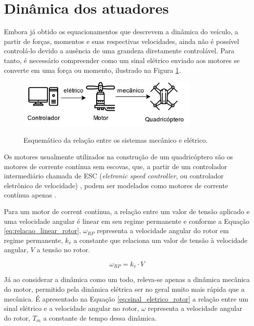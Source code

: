\documentclass[main.tex]{subfiles}
\begin{document}
\section{Dinâmica dos atuadores}

Embora já obtido os equacionamentos que descrevem a dinâmica do veículo, a partir de forças, momentos e suas respectivas velocidades, ainda não é possível controlá-lo devido a ausência de uma grandeza diretamente controlável. Para tanto, é necessário compreender como um sinal elétrico enviado aos motores se converte em uma força ou momento, ilustrado na Figura \ref{fig:sistemas_mecanico_eletrico}. 

\begin{figure}[!h]
	\centering
	\caption{Esquemático da relação entre os sistemas mecânico e elétrico.}
	\includegraphics[width=0.8\textwidth]{capitulos/modelagem/imgs/sistema.png}
	\label{fig:sistemas_mecanico_eletrico}
\end{figure}

Os motores usualmente utilizados na construção de um quadricóptero são os motores de corrente contínua sem escovas, que, a partir de um controlador intermediário chamada de ESC (\textit{eletronic speed controller}, ou controlador eletrônico de velocidade) \cite{esc_ref}, podem ser modelados como motores de corrente contínua apenas \cite{popoola2015modelling}. 

Para um motor de corrent contínua, a relação entre um valor de tensão aplicado e uma velocidade angular é linear em seu regime permanente e conforme a Equação \ref{eq:relacao_linear_rotor}, $\omega_{RP}$ representa a velocidade angular do rotor em regime permanente, $k_v$ a constante que relaciona um valor de tensão à velocidade angular, $V$ a tensão no rotor.

\begin{equation}\label{eq:relacao_linear_rotor}
	\omega_{RP} = k_v \cdot V
\end{equation}

Já ao considerar a dinâmica como um todo, releva-se apenas a dinâmica mecânica do motor, permitido pela dinâmica elétrica ser no geral muito mais rápida que a mecânica. É apresentado na Equação \ref{eq:sinal_eletrico_rotor} a relação entre um sinal elétrico e a velocidade angular no rotor, $\omega$ representa a velocidade angular do rotor, $T_m$ a constante de tempo dessa dinâmica.
\end{document}
